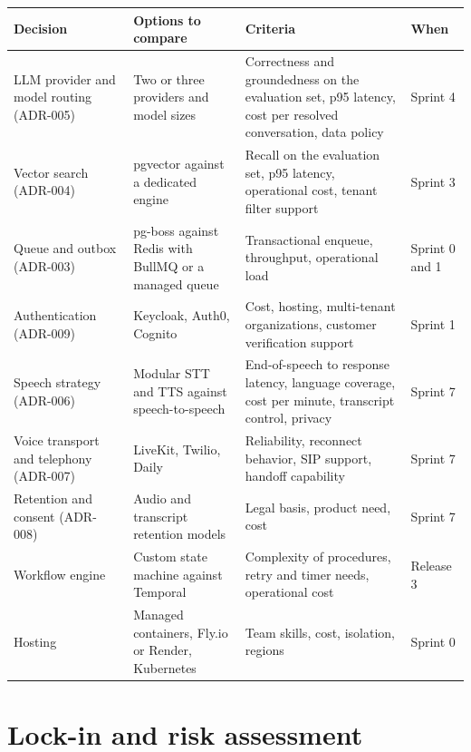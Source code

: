{\small
\begin{longtable}{@{}>{\raggedright\arraybackslash}p{}>{\raggedright\arraybackslash}p{}>{\raggedright\arraybackslash}p{}>{\raggedright\arraybackslash}p{}@{}}
\toprule
\textbf{Decision} & \textbf{Options to compare} & \textbf{Criteria} & \textbf{When} \\
\midrule
\endhead
\bottomrule
\endfoot
LLM provider and model routing (ADR-005) & Two or three providers and model sizes & Correctness and groundedness on the evaluation set, p95 latency, cost per resolved conversation, data policy & Sprint 4 \\
Vector search (ADR-004) & pgvector against a dedicated engine & Recall on the evaluation set, p95 latency, operational cost, tenant filter support & Sprint 3 \\
Queue and outbox (ADR-003) & pg-boss against Redis with BullMQ or a managed queue & Transactional enqueue, throughput, operational load & Sprint 0 and 1 \\
Authentication (ADR-009) & Keycloak, Auth0, Cognito & Cost, hosting, multi-tenant organizations, customer verification support & Sprint 1 \\
Speech strategy (ADR-006) & Modular STT and TTS against speech-to-speech & End-of-speech to response latency, language coverage, cost per minute, transcript control, privacy & Sprint 7 \\
Voice transport and telephony (ADR-007) & LiveKit, Twilio, Daily & Reliability, reconnect behavior, SIP support, handoff capability & Sprint 7 \\
Retention and consent (ADR-008) & Audio and transcript retention models & Legal basis, product need, cost & Sprint 7 \\
Workflow engine & Custom state machine against Temporal & Complexity of procedures, retry and timer needs, operational cost & Release 3 \\
Hosting & Managed containers, Fly.io or Render, Kubernetes & Team skills, cost, isolation, regions & Sprint 0 \\
\end{longtable}
}

\section{Lock-in and risk assessment}

